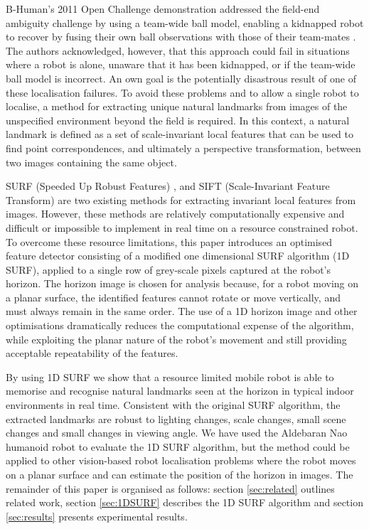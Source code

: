 \documentclass[runningheads,a4paper]{llncs}
\begin{document}
B-Human's 2011 Open Challenge demonstration addressed the field-end ambiguity challenge by using a team-wide ball model, enabling a kidnapped robot to recover by fusing their own ball observations with those of their team-mates \cite{thomas11code}. The authors acknowledged, however, that this approach could fail in situations where a robot is alone, unaware that it has been kidnapped, or if the team-wide ball model is incorrect. An own goal is the potentially disastrous result of one of these localisation failures. To avoid these problems and to allow a single robot to localise, a method for extracting unique natural landmarks from images of the unspecified environment beyond the field is required. In this context, a natural landmark is defined as a set of scale-invariant local features that can be used to find point correspondences, and ultimately a perspective transformation, between two images containing the same object.

SURF (Speeded Up Robust Features) \cite{bay2006SURF}, \cite{bay2008SURF} and SIFT (Scale-Invariant Feature Transform) \cite{lowe2004SIFT} are two existing methods for extracting invariant local features from images. However, these methods are relatively computationally expensive and difficult or impossible to implement in real time on a resource constrained robot. To overcome these resource limitations, this paper introduces an optimised feature detector consisting of a modified one dimensional SURF algorithm (1D SURF), applied to a single row of grey-scale pixels captured at the robot's horizon. The horizon image is chosen for analysis because, for a robot moving on a planar surface, the identified features cannot rotate or move vertically, and must always remain in the same order. The use of a 1D horizon image and other optimisations dramatically reduces the computational expense of the algorithm, while exploiting the planar nature of the robot's movement and still providing acceptable repeatability of the features. 

By using 1D SURF we show that a resource limited mobile robot is able to memorise and recognise natural landmarks seen at the horizon in typical indoor environments in real time.  Consistent with the original SURF algorithm, the extracted landmarks are robust to lighting changes, scale changes, small scene changes and small changes in viewing angle. We have used the Aldebaran Nao humanoid robot to evaluate the 1D SURF algorithm, but the method could be applied to other vision-based robot localisation problems where the robot moves on a planar surface and can estimate the position of the horizon in images. The remainder of this paper is organised as follows:  section \ref{sec:related} outlines related work, section \ref{sec:1DSURF} describes the 1D SURF algorithm and section \ref{sec:results} presents experimental results.
\end{document}
